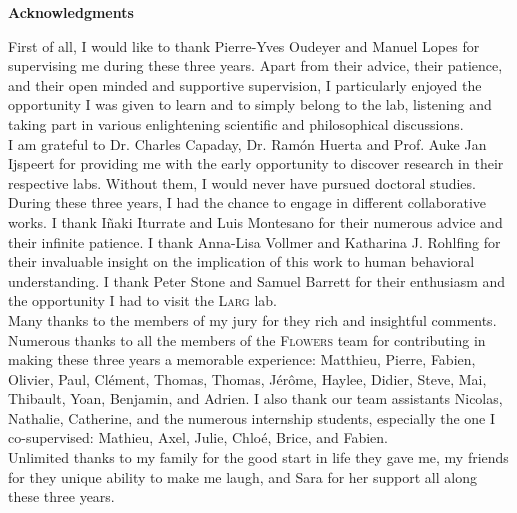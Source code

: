 
\begin{vcenterpage}
\begin{center}
{\large\textbf{Acknowledgments\\}}
\end{center}



\noindent First of all, I would like to thank Pierre-Yves Oudeyer and Manuel Lopes for supervising me during these three years. Apart from their advice, their patience, and their open minded and supportive supervision, I particularly enjoyed the opportunity I was given to learn and to simply belong to the lab, listening and taking part in various enlightening scientific and philosophical discussions.\\

\noindent I am grateful to Dr. Charles Capaday, Dr. Ram\'{o}n Huerta and Prof. Auke Jan Ijspeert for providing me with the early opportunity to discover research in their respective labs. Without them, I would never have pursued doctoral studies.\\

\noindent During these three years, I had the chance to engage in different collaborative works. I thank I{\~n}aki Iturrate and Luis Montesano for their numerous advice and their infinite patience. I thank Anna-Lisa Vollmer and Katharina J. Rohlfing for their invaluable insight on the implication of this work to human behavioral understanding. I thank Peter Stone and Samuel Barrett for their enthusiasm and the opportunity I had to visit the \textsc{Larg} lab.\\

\noindent Many thanks to the members of my jury for they rich and insightful comments.\\

\noindent Numerous thanks to all the members of the \textsc{Flowers} team for contributing in making these three years a memorable experience: Matthieu, Pierre, Fabien, Olivier, Paul, Cl\'{e}ment, Thomas, Thomas, J\'{e}r\^{o}me, Haylee, Didier, Steve,  Mai, Thibault, Yoan, Benjamin, and Adrien. I also thank our team assistants Nicolas, Nathalie, Catherine, and the numerous internship students, especially the one I co-supervised: Mathieu, Axel, Julie, Chlo\'{e}, Brice, and Fabien.\\

\noindent Unlimited thanks to my family for the good start in life they gave me, my friends for they unique ability to make me laugh, and Sara for her support all along these three years.\\


\end{vcenterpage}